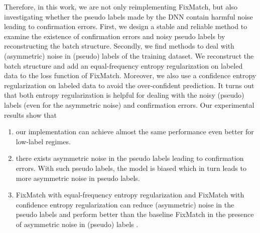 Therefore, in this work, we are not only reimplementing FixMatch, but also investigating whether the pseudo labels made by the DNN contain harmful noise leading to confirmation errors. 
First, we design a stable and reliable method to examine the existence of confirmation errors and noisy pseudo labels by reconstructing the batch structure.
Secondly, we find methods to deal with (asymmetric) noise in (pseudo) labels of the training dataset. 
We reconstruct the batch structure and add an equal-frequency entropy regularization on labeled data to the loss function of FixMatch. 
Moreover, we also use a confidence entropy regularization on labeled data to avoid the over-confident prediction. 
It turns out that both entropy regularization is helpful for dealing with the noisy (pseudo) labels (even for the asymmetric noise) and confirmation errors.
Our experimental results show that \\
\begin{enumerate}
\vspace{-0.5cm}
    \item our implementation can achieve almost the same performance even better for low-label regimes.
    \item there exists asymmetric noise in the pseudo labels leading to confirmation errors. With such pseudo labels, the model is biased which in turn leads to more asymmetric noise in pseudo labels.
    \item FixMatch with equal-frequency entropy regularization and FixMatch with confidence entropy regularization can reduce (asymmetric) noise in the pseudo labels and perform better than the baseline FixMatch in the presence of asymmetric noise in (pseudo) labels .
\end{enumerate}
